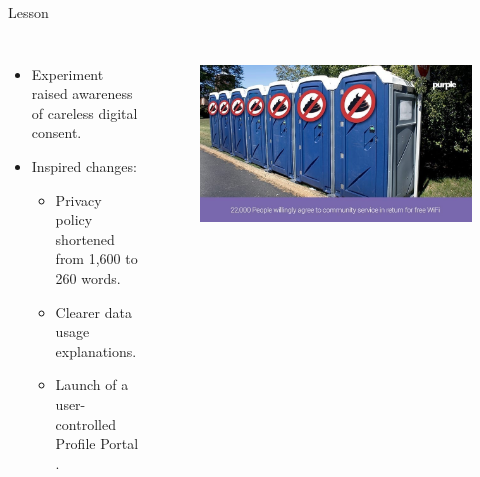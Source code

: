 \begin{frame}{Lesson}
\begin{columns}[c]
    \begin{itemize}
    \item Experiment raised awareness of careless digital consent.
    \item Inspired changes:
    \begin{itemize}
        \item Privacy policy shortened from 1,600 to 260 words.
        \item Clearer data usage explanations.
        \item Launch of a user-controlled Profile Portal \cite{TOILET}.
    \end{itemize}
\end{itemize}
    \centering
    \begin{figure}
        \centering
        \includegraphics[width=\textwidth]{images/toilet.png}
        \label{fig:toilet}
    \end{figure}    
\end{columns}
\end{frame}

